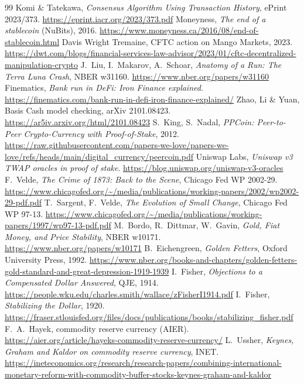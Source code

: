 \begin{thebibliography}{99}
 Komi \& Tatekawa, \emph{Consensus Algorithm Using Transaction History}, ePrint 2023/373. \url{https://eprint.iacr.org/2023/373.pdf}
 Moneyness, \emph{The end of a stablecoin} (NuBits), 2016. \url{https://www.moneyness.ca/2016/08/end-of-stablecoin.html}
 Davis Wright Tremaine, CFTC action on Mango Markets, 2023. \url{https://dwt.com/blogs/financial-services-law-advisor/2023/01/cftc-decentralized-manipulation-crypto}
 J.~Liu, I.~Makarov, A.~Schoar, \emph{Anatomy of a Run: The Terra Luna Crash}, NBER w31160. \url{https://www.nber.org/papers/w31160}
 Finematics, \emph{Bank run in DeFi: Iron Finance explained}. \url{https://finematics.com/bank-run-in-defi-iron-finance-explained/}
 Zhao, Li \& Yuan, Basis Cash model checking, arXiv 2101.08423. \url{https://ar5iv.arxiv.org/html/2101.08423}
 S.~King, S.~Nadal, \emph{PPCoin: Peer-to-Peer Crypto-Currency with Proof-of-Stake}, 2012. \url{https://raw.githubusercontent.com/papers-we-love/papers-we-love/refs/heads/main/digital_currency/peercoin.pdf}
 Uniswap Labs, \emph{Uniswap v3 TWAP oracles in proof of stake}. \url{https://blog.uniswap.org/uniswap-v3-oracles}
 F.~Velde, \emph{The Crime of 1873: Back to the Scene}, Chicago Fed WP 2002-29. \url{https://www.chicagofed.org/~/media/publications/working-papers/2002/wp2002-29-pdf.pdf}
 T.~Sargent, F.~Velde, \emph{The Evolution of Small Change}, Chicago Fed WP 97-13. \url{https://www.chicagofed.org/~/media/publications/working-papers/1997/wp97-13-pdf.pdf}
 M.~Bordo, R.~Dittmar, W.~Gavin, \emph{Gold, Fiat Money, and Price Stability}, NBER w10171. \url{https://www.nber.org/papers/w10171}
 B.~Eichengreen, \emph{Golden Fetters}, Oxford University Press, 1992. \url{https://www.nber.org/books-and-chapters/golden-fetters-gold-standard-and-great-depression-1919-1939}
 I.~Fisher, \emph{Objections to a Compensated Dollar Answered}, QJE, 1914. \url{https://people.wku.edu/charles.smith/wallace/zFisherI1914.pdf}
 I.~Fisher, \emph{Stabilizing the Dollar}, 1920. \url{https://fraser.stlouisfed.org/files/docs/publications/books/stabilizing_fisher.pdf}
 F.~A.~Hayek, commodity reserve currency (AIER). \url{https://aier.org/article/hayeks-commodity-reserve-currency/}
 L.~Ussher, \emph{Keynes, Graham and Kaldor on commodity reserve currency}, INET. \url{https://ineteconomics.org/research/research-papers/combining-international-monetary-reform-with-commodity-buffer-stocks-keynes-graham-and-kaldor}

\end{thebibliography}
